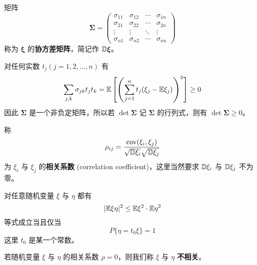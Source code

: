 \begin{definition}[协方差矩阵]\label{def:协方差矩阵}
    矩阵
\begin{equation} \label{eq:covariance_matrix}
\boldsymbol{\Sigma} = \begin{pmatrix}
\sigma_{11} & \sigma_{12} & \cdots & \sigma_{1n} \\
\sigma_{21} & \sigma_{22} & \cdots & \sigma_{2n} \\
\vdots & \vdots & \ddots & \vdots \\
\sigma_{n1} & \sigma_{n2} & \cdots & \sigma_{nn}
\end{pmatrix}
\end{equation}
称为 $\boldsymbol{\xi}$ 的\textbf{协方差矩阵}，简记作 $\mathbb{D}\boldsymbol{\xi}$。
\end{definition}
 对任何实数 $t_j(j=1,2,\ldots,n)$ 有
\[
\sum_{j,k} \sigma_{jk}t_j t_k = \mathbb{E}\left[ \left(\sum_{j=1}^n t_j(\xi_j-\mathbb{E}\xi_j)\right)^2 \right] \ge 0
\]
因此 $\boldsymbol{\Sigma}$ 是一个非负定矩阵，所以若 $\det \boldsymbol{\Sigma}$ 记 $\boldsymbol{\Sigma}$ 的行列式，则有 $\det \boldsymbol{\Sigma} \ge 0$。
\begin{definition}[相关系数] \label{def:correlation_coefficient}
称
\begin{equation} \label{eq:correlation_coefficient_formula}
\rho_{ij}=\frac{\text{cov}(\xi_i,\xi_j)}{\sqrt{\mathbb{D}\xi_i}\sqrt{\mathbb{D}\xi_j}}
\end{equation}
为 $\xi_i$ 与 $\xi_j$ 的\textbf{相关系数} (correlation coefficient)，这里当然要求 $\mathbb{D}\xi_i$ 与 $\mathbb{D}\xi_j$ 不为零。
\end{definition}
\begin{theorem} \label{thm:cauchy_schwarz}
对任意随机变量 $\xi$ 与 $\eta$ 都有
\begin{equation} \label{eq:cauchy_schwarz_inequality}
|\mathbb{E}\xi\eta|^2\le\mathbb{E}\xi^2 \cdot \mathbb{E}\eta^2
\end{equation}
等式成立当且仅当
\begin{equation} \label{eq:cauchy_schwarz_equality_condition}
P\{\eta=t_0\xi\}=1
\end{equation}
这里 $t_0$ 是某一个常数。
\end{theorem}

\begin{definition}[相关性] \label{def:uncorrelated}
若随机变量 $\xi$ 与 $\eta$ 的相关系数 $\rho=0$，则我们称 $\xi$ 与 $\eta$ \textbf{不相关}。
\end{definition}

